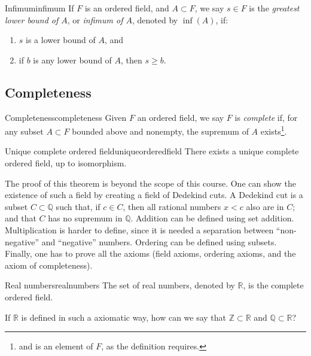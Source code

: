 \begin{defn}{Infimum}{infimum}
	If \(F\) is an ordered field, and \(A \subset F\), we say \(s \in F\) is the \emph{greatest lower bound of \(A\)}, or \emph{infimum of \(A\)}, denoted by \(\inf(A)\), if:
	\begin{enumerate}
		\item \(s\) is a lower bound of \(A\), and
		\item if \(b\) is any lower bound of \(A\), then \(s \geq b\).
	\end{enumerate}
\end{defn}

\subsection{Completeness}

\begin{defn}{Completeness}{completeness}
	Given \(F\) an ordered field, we say \(F\) is \emph{complete} if, for any subset \(A \subset F\) bounded above and nonempty, the supremum of \(A\) exists\footnote{and is an element of \(F\), as the definition requires.}.
\end{defn}

\begin{thm}{Unique complete ordered field}{uniqueorderedfield}
	There exists a unique complete ordered field, up to isomorphism. 
\end{thm}

The proof of this theorem is beyond the scope of this course. One can show the existence of such a field by creating a field of Dedekind cuts. A Dedekind cut is a subset \(C \subset \mathbb{Q}\) such that, if \(c \in C\), then all rational numbers \(x < c\) also are in \(C\); and that \(C\) has no supremum in \(\mathbb{Q}\). Addition can be defined using set addition. Multiplication is harder to define, since it is needed a separation between ``non-negative'' and ``negative'' numbers. Ordering can be defined using subsets. Finally, one has to prove all the axioms (field axioms, ordering axioms, and the axiom of completeness).

\begin{defn}{Real numbers}{realnumbers}
	The set of real numbers, denoted by \(\mathbb{R}\), is the complete ordered field.
\end{defn}

\begin{que}{}{}
	If \(\mathbb{R}\) is defined in such a axiomatic way, how can we say that \(\mathbb{Z} \subset \mathbb{R}\) and \(\mathbb{Q} \subset \mathbb{R}\)?
\end{que}

